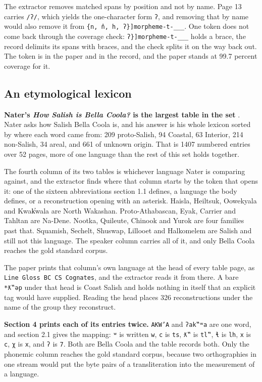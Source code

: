 The extractor removes matched spans by position and not by name. Page 13 carries \texttt{/ʔ/}, which yields the one-character form \texttt{ʔ}, and removing that by name would also remove it from \texttt{\{n, n̓, h, ʔ\}]morpheme-t-\_\_\_}. One token does not come back through the coverage check: \texttt{ʔ\}]morpheme-t-\_\_\_} holds a brace, the record delimits its spans with braces, and the check splits it on the way back out. The token is in the paper and in the record, and the paper stands at 99.7 percent coverage for it.

\subsection{An etymological lexicon}

\textbf{Nater's \emph{How Salish is Bella Coola?} is the largest table in the set} \cite{src:Nater-2013}. Nater asks how Salish Bella Coola is, and his answer is his whole lexicon sorted by where each word came from: 209 proto-Salish, 94 Coastal, 63 Interior, 214 non-Salish, 34 areal, and 661 of unknown origin. That is 1407 numbered entries over 52 pages, more of one language than the rest of this set holds together.

The fourth column of its two tables is whichever language Nater is comparing against, and the extractor finds where that column starts by the token that opens it: one of the sixteen abbreviations section 1.1 defines, a language the body defines, or a reconstruction opening with an asterisk. Haisla, Heiltsuk, Oowekyala and Kwak̓wala are North Wakashan. Proto-Athabascan, Eyak, Carrier and Tahltan are Na-Dene. Nootka, Quileute, Chinook and Yurok are four families past that. Squamish, Sechelt, Shuswap, Lillooet and Halkomelem are Salish and still not this language. The speaker column carries all of it, and only Bella Coola reaches the gold standard corpus.

The paper prints that column's own language at the head of every table page, as \texttt{Line Gloss BC CS Cognates}, and the extractor reads it from there. A bare \texttt{*ƛ‟ǝp} under that head is Coast Salish and holds nothing in itself that an explicit tag would have supplied. Reading the head places 326 reconstructions under the name of the group they reconstruct.

\textbf{Section 4 prints each of its entries twice.} \texttt{AKW'A} and \texttt{ʔak‟ʷa} are one word, and section 2.1 gives the mapping: \texttt{ʷ} is written \texttt{w}, \texttt{c} is \texttt{ts}, \texttt{ƛ‟} is \texttt{tl‟}, \texttt{ɬ} is \texttt{lh}, \texttt{x} is \texttt{c}, \texttt{χ} is \texttt{x}, and \texttt{ʔ} is \texttt{7}. Both are Bella Coola and the table records both. Only the phonemic column reaches the gold standard corpus, because two orthographies in one stream would put the byte pairs of a transliteration into the measurement of a language.

